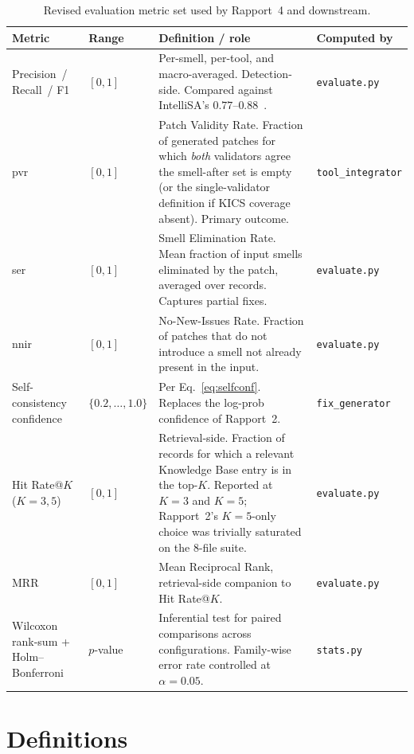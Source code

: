 \documentclass[12pt, a4paper]{report}
\begin{document}
\begin{table}[H]
  \centering
  \caption{Revised evaluation metric set used by Rapport~4 and downstream.}
  \label{tab:metrics}
  \small
  \begin{tabularx}{\linewidth}{l l X l}
    \toprule
    \textbf{Metric} & \textbf{Range} & \textbf{Definition / role} & \textbf{Computed by} \\
    \midrule
    Precision~/ Recall~/ F1 & $[0,1]$ &
      Per-smell, per-tool, and macro-averaged. Detection-side. Compared
      against IntelliSA's $0.77$--$0.88$~\citep{intellisa2026}.
      & \texttt{evaluate.py} \\
    \gls{pvr} & $[0,1]$ &
      Patch Validity Rate. Fraction of generated patches for which
      \emph{both} validators agree the smell-after set is empty (or the
      single-validator definition if KICS coverage absent). Primary
      outcome.
      & \texttt{tool\_integrator} \\
    \gls{ser} & $[0,1]$ &
      Smell Elimination Rate. Mean fraction of input smells eliminated by
      the patch, averaged over records. Captures partial fixes.
      & \texttt{evaluate.py} \\
    \gls{nnir} & $[0,1]$ &
      No-New-Issues Rate. Fraction of patches that do not introduce a smell
      not already present in the input.
      & \texttt{evaluate.py} \\
    Self-consistency confidence & $\{0.2,\ldots,1.0\}$ &
      Per Eq.~\ref{eq:selfconf}. Replaces the log-prob confidence of
      Rapport~2.
      & \texttt{fix\_generator} \\
    Hit Rate@$K$ ($K=3,5$) & $[0,1]$ &
      Retrieval-side. Fraction of records for which a relevant Knowledge
      Base entry is in the top-$K$. Reported at $K=3$ and $K=5$;
      Rapport~2's $K=5$-only choice was trivially saturated on the
      8-file suite.
      & \texttt{evaluate.py} \\
    MRR & $[0,1]$ &
      Mean Reciprocal Rank, retrieval-side companion to Hit Rate@$K$.
      & \texttt{evaluate.py} \\
    Wilcoxon rank-sum + Holm--Bonferroni & $p$-value &
      Inferential test for paired comparisons across configurations.
      Family-wise error rate controlled at $\alpha = 0.05$.
      & \texttt{stats.py} \\
    \bottomrule
  \end{tabularx}
\end{table}

\section{Definitions}
\label{sec:metrics}
\end{document}
